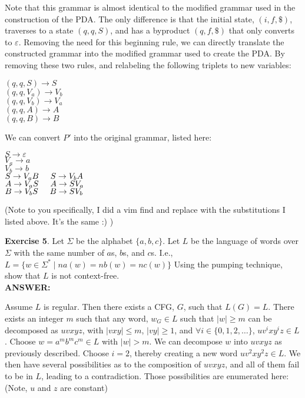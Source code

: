 \documentclass{article}
\begin{document}
Note that this grammar is almost identical to the modified grammar used in the construction of the PDA. The only difference is that the initial state, $(i, f, \$)$, traverses to a state $(q, q, S)$, and has a byproduct $(q, f, \$)$ that only converts to $\varepsilon$. Removing the need for this beginning rule, we can directly translate the constructed grammar into the modified grammar used to create the PDA. By removing these two rules, and relabeling the following triplets to new variables:
\begin{center}
	$(q, q, S) \rightarrow S$\\
	$(q, q, V_a) \rightarrow V_b$\\
	$(q, q, V_b) \rightarrow V_a$\\
	$(q, q, A) \rightarrow A$\\
	$(q, q, B) \rightarrow B$\\
\end{center}

We can convert $P'$ into the original grammar, listed here:

\begin{center}
	$S \rightarrow \varepsilon$ \\
	$V_a \rightarrow a$ \\
	$V_b \rightarrow b$ \\
	$S \rightarrow V_aB \hspace{0.5cm} S \rightarrow V_bA$ \\
	$A \rightarrow V_aS \hspace{0.5cm} A \rightarrow SV_a$ \\
	$B \rightarrow V_bS \hspace{0.5cm} B \rightarrow SV_b$ \\
\end{center}

(Note to you specifically, I did a vim find and replace with the substitutions I listed above. It's the same :) )

\textbf{Exercise 5}. Let $\Sigma$ be the alphabet $\{a, b, c\}$. Let $L$ be the language of words
over $\Sigma$ with the same number of $a$s, $b$s, and $c$s. I.e.,
$L = \{w \in \Sigma^* \mid na(w) = nb(w) = nc(w)\}$
Using the pumping technique, show that $L$ is not context-free.\\

\textbf{ANSWER:}


Assume $L$ is regular. Then there exists a CFG, $G$, such that $L(G) = L$. There exists an integer $m$ such that any word, $w_G \in L$ such that $|w| \geq m$ can be decomposed as $uvxyz$, with $|vxy| \leq m$, $|vy| \geq 1$, and $\forall i \in \{0, 1, 2, \ldots\}$, $uv^ixy^iz \in L$. Choose $w = a^mb^mc^m \in L$ with $|w| > m$. We can decompose $w$ into $uvxyz$ as previously described. Choose $i = 2$, thereby creating a new word $uv^2xy^2z \in L$. We then have several possibilities as to the composition of $uvxyz$, and all of them fail to be in $L$, leading to a contradiction. Those possibilities are enumerated here: (Note, $u$ and $z$ are constant)
\end{document}
